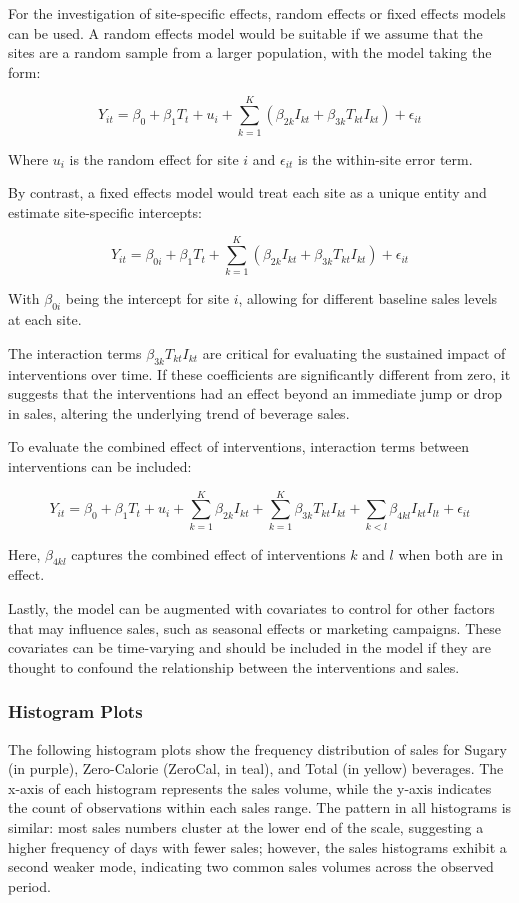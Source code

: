 \documentclass[
]{article}
\begin{document}
For the investigation of site-specific effects, random effects or fixed
effects models can be used. A random effects model would be suitable if
we assume that the sites are a random sample from a larger population,
with the model taking the form:

\[Y_{it} = \beta_0 + \beta_1 T_t + u_i + \sum_{k=1}^{K} (\beta_{2k} I_{kt} + \beta_{3k} T_{kt} I_{kt}) + \epsilon_{it} \]

Where \(u_i\) is the random effect for site \(i\) and \(\epsilon_{it}\)
is the within-site error term.

By contrast, a fixed effects model would treat each site as a unique
entity and estimate site-specific intercepts:

\[Y_{it} = \beta_{0i} + \beta_1 T_t + \sum_{k=1}^{K} (\beta_{2k} I_{kt} + \beta_{3k} T_{kt} I_{kt}) + \epsilon_{it} \]

With \(\beta_{0i}\) being the intercept for site \(i\), allowing for
different baseline sales levels at each site.

The interaction terms \(\beta_{3k} T_{kt} I_{kt}\) are critical for
evaluating the sustained impact of interventions over time. If these
coefficients are significantly different from zero, it suggests that the
interventions had an effect beyond an immediate jump or drop in sales,
altering the underlying trend of beverage sales.

To evaluate the combined effect of interventions, interaction terms
between interventions can be included:

\[Y_{it} = \beta_0 + \beta_1 T_t + u_i + \sum_{k=1}^{K} \beta_{2k} I_{kt} + \sum_{k=1}^{K} \beta_{3k} T_{kt} I_{kt} + \sum_{k<l} \beta_{4kl} I_{kt} I_{lt} + \epsilon_{it} \]

Here, \(\beta_{4kl}\) captures the combined effect of interventions
\(k\) and \(l\) when both are in effect.

Lastly, the model can be augmented with covariates to control for other
factors that may influence sales, such as seasonal effects or marketing
campaigns. These covariates can be time-varying and should be included
in the model if they are thought to confound the relationship between
the interventions and sales.

\hypertarget{histogram-plots}{%
\subsubsection{Histogram Plots}\label{histogram-plots}}

The following histogram plots show the frequency distribution of sales
for Sugary (in purple), Zero-Calorie (ZeroCal, in teal), and Total (in
yellow) beverages. The x-axis of each histogram represents the sales
volume, while the y-axis indicates the count of observations within each
sales range. The pattern in all histograms is similar: most sales
numbers cluster at the lower end of the scale, suggesting a higher
frequency of days with fewer sales; however, the sales histograms
exhibit a second weaker mode, indicating two common sales volumes across
the observed period.
\end{document}

